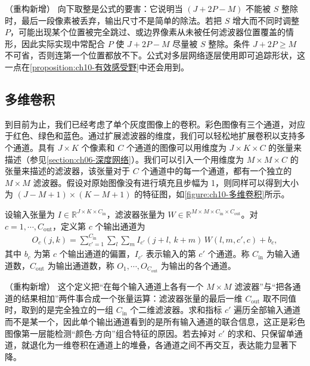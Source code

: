 \documentclass[../../main.tex]{subfiles}
\begin{document}
\begin{remark}（重构新增）
向下取整是公式的要害：它说明当 $(J+2P-M)$ 不能被 $S$ 整除时，最后一段像素被丢弃，输出尺寸不是简单的除法。若把 $S$ 增大而不同时调整 $P$，可能出现某个位置被完全跳过、或边界像素从未被任何滤波器位置覆盖的情形，因此实际实现中常配合 $P$ 使 $J+2P-M$ 尽量被 $S$ 整除。条件 $J+2P\geqslant M$ 不可省，否则连第一个位置都放不下。公式对多层网络逐层使用即可追踪形状，这一点在\cref{proposition:ch10-有效感受野}中还会用到。
\end{remark}

\subsection{多维卷积}\label{subsection:ch10-多维卷积}

到目前为止，我们已经考虑了单个灰度图像上的卷积。彩色图像有三个通道，对应于红色、绿色和蓝色。通过扩展滤波器的维度，我们可以轻松地扩展卷积以支持多个通道。具有 $J\times K$ 个像素和 $C$ 个通道的图像可以用维度为 $J\times K\times C$ 的张量来描述（参见\cref{section:ch06-深度网络}）。我们可以引入一个用维度为 $M\times M\times C$ 的张量来描述的滤波器，该张量对于 $C$ 个通道中的每一个通道，都有一个独立的 $M\times M$ 滤波器。假设对原始图像没有进行填充且步幅为 1，则同样可以得到大小为 $(J-M+1)\times (K-M+1)$ 的特征图，如\cref{figure:ch10-多维卷积}所示。

\begin{definition}[多通道卷积与通道数]\label{definition:ch10-多维卷积}
设输入张量为 $I\in\mathbb{R}^{J\times K\times C_{\mathrm{in}}}$，滤波器张量为 $W\in\mathbb{R}^{M\times M\times C_{\mathrm{in}}\times C_{\mathrm{out}}}$。对 $c=1,\cdots,C_{\mathrm{out}}$，定义第 $c$ 个输出通道为
\begin{align}
  O_c(j,k)=\sum_{c'=1}^{C_{\mathrm{in}}}\sum_{l}\sum_{m} I_{c'}(j+l,\,k+m)\,W(l,m,c',c)+b_c,
  \label{align:ch10-多通道卷积}
\end{align}
其中 $b_c$ 为第 $c$ 个输出通道的偏置，$I_{c'}$ 表示输入的第 $c'$ 个通道。称 $C_{\mathrm{in}}$ 为输入通道数，$C_{\mathrm{out}}$ 为输出通道数，称 $O_1,\cdots,O_{C_{\mathrm{out}}}$ 为输出的各个通道。
\end{definition}

\begin{remark}（重构新增）
这个定义把“在每个输入通道上各有一个 $M\times M$ 滤波器”与“把各通道的结果相加”两件事合成一个张量运算：滤波器张量的最后一维 $C_{\mathrm{out}}$ 取不同值时，取到的是完全独立的一组 $C_{\mathrm{in}}$ 个二维滤波器。求和指标 $c'$ 遍历全部输入通道而不是某一个，因此单个输出通道看到的是所有输入通道的联合信息，这正是彩色图像第一层能检测“颜色-方向”组合特征的原因。若去掉对 $c'$ 的求和、只保留单通道，就退化为一维卷积在通道上的堆叠，各通道之间不再交互，表达能力显著下降。
\end{remark}
\end{document}
